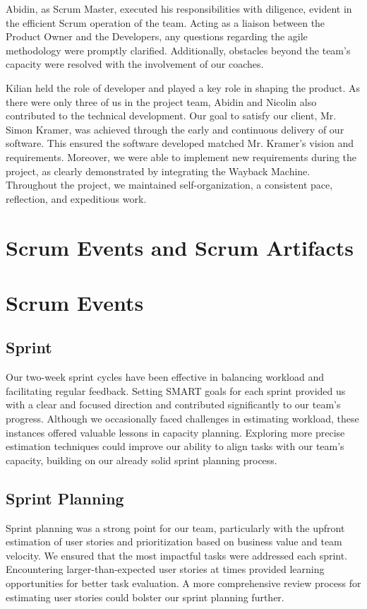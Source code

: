 Abidin, as Scrum Master, executed his responsibilities with diligence, evident in the efficient Scrum operation of the team.
Acting as a liaison between the Product Owner and the Developers, any questions regarding the agile methodology were promptly clarified.
Additionally, obstacles beyond the team's capacity were resolved with the involvement of our coaches.

Kilian held the role of developer and played a key role in shaping the product.
As there were only three of us in the project team, Abidin and Nicolin also contributed to the technical development.
Our goal to satisfy our client, Mr. Simon Kramer, was achieved through the early and continuous delivery of our software.
This ensured the software developed matched Mr. Kramer's vision and requirements.
Moreover, we were able to implement new requirements during the project, as clearly demonstrated by integrating the Wayback Machine.
Throughout the project, we maintained self-organization, a consistent pace, reflection, and expeditious work.


\section{Scrum Events and Scrum Artifacts}

\section{Scrum Events}

\subsection{Sprint}
Our two-week sprint cycles have been effective in balancing workload and facilitating regular feedback.
Setting SMART goals for each sprint provided us with a clear and focused direction and contributed significantly to our team's progress.
Although we occasionally faced challenges in estimating workload, these instances offered valuable lessons in capacity planning.
Exploring more precise estimation techniques could improve our ability to align tasks with our team's capacity, building on our already solid sprint planning process.

\subsection{Sprint Planning}
Sprint planning was a strong point for our team, particularly with the upfront estimation of user stories and prioritization based on business value and team velocity.
We ensured that the most impactful tasks were addressed each sprint.
Encountering larger-than-expected user stories at times provided learning opportunities for better task evaluation.
A more comprehensive review process for estimating user stories could bolster our sprint planning further.

